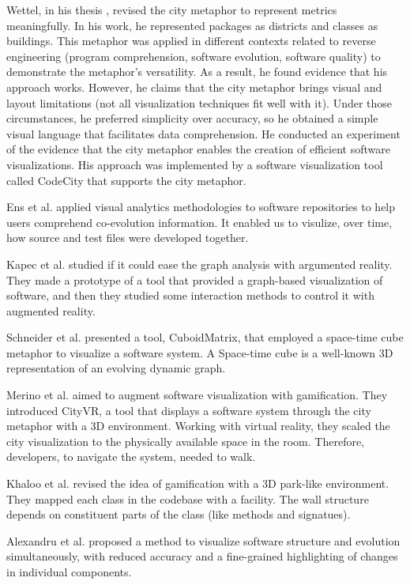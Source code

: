 Wettel, in his thesis \cite{Wettel2011}, revised the city metaphor to represent metrics meaningfully. 
In his work, he represented packages as districts and classes as buildings.
This metaphor was applied in different contexts related to reverse engineering (program comprehension, software evolution, software quality)
to demonstrate the metaphor's versatility. As a result, he found evidence that his approach works.
However, he claims that the city metaphor brings visual and layout limitations 
(not all visualization techniques fit well with it). Under those circumstances, he preferred simplicity over accuracy,
so he obtained a simple visual language that facilitates data comprehension. He conducted an experiment of the evidence that the city
metaphor enables the creation of efficient software visualizations. His approach was implemented by a software visualization tool 
called CodeCity that supports the city metaphor. 





Ens et al. \cite{Ens2014} applied visual analytics methodologies to software repositories to help
users comprehend co-evolution information. It enabled us to visulize, over time, how source and test files were developed together. 

Kapec et al. \cite{Kapec2015} studied if it could ease the graph analysis with argumented reality. 
They made a prototype of a tool that provided a graph-based visualization of software, and then they studied some interaction methods to control it with augmented reality.

Schneider et al. \cite{Schneider2016} presented a tool, CuboidMatrix, that employed a space-time cube metaphor to visualize a software system. 
A Space-time cube is a well-known 3D representation of an evolving dynamic graph. 


Merino et al. \cite{Merino2017} aimed to augment software visualization with gamification. 
They introduced CityVR, a tool that displays a software system through the city metaphor with a 3D environment. 
Working with virtual reality, they scaled the city visualization to the physically available space in the room. 
Therefore, developers, to navigate the system, needed to walk. 

Khaloo et al. \cite{Khaloo2017} revised the idea of gamification with a 3D park-like environment.
 They mapped each class in the codebase with a facility. The wall structure depends on constituent parts of the class (like methods and signatues). 

Alexandru et al. \cite{Alexandru2019} proposed a method to visualize software structure and evolution simultaneously, 
with reduced accuracy and a fine-grained highlighting of changes in individual components. 


